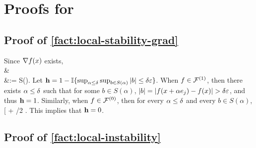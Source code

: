 \section{Proofs for \downtaskNAMEs{}}\label{sec:application-proofs}

\subsection{Proof of \cref{fact:local-stability-grad}}
%
%
%
%
%
%
%
%
%
%
%
%
%
%
%
%
%
%
%
%
%
%
%
%
%
%
%
%
%
Since $\nabla f(x)$ exists,
\*[
    \grad_j \model(\covval)
    = \lim_{\alpha \to 0} \frac{\model(\covval+\alpha e_j) - \model(\covval)}{\alpha}.
\]
Thus, for any $\outscale'>0$ there exists $\inscale>0$ such that for all $\alpha \leq \inscale$,
\*[
    \frac{\model(\covval+\alpha e_j) - \model(\covval)}{\alpha} 
    &\in
    \Big[
    \alpha \grad_j \model(\covval) - \alpha \outscale/4,
    \alpha \grad_j \model(\covval) + \alpha \outscale/4
    \Big] \\
    &\subseteq
     \\
    &:= S(\alpha).
\]
Let $\oraclehyptest = 1-\ind{\sup_{\alpha\leq\inscale} \sup_{b \in S(\alpha)} \abs{b} \leq \inscale \outscale}$. When $f \in \mathcal{F}^{(1)}$, then there exists $\alpha \leq \inscale$ such that for some $b \in S(\alpha)$, $\abs{b} = \abs{\model(\covval+\alpha e_j) - \model(\covval)} > \inscale\outscale$, and thus $\mathbf{h} = 1$.
Similarly, when $f\in\mathcal{F}^{(0)}$, then for every $\alpha \leq \inscale$ and every $b \in S(\alpha)$,
\*[
    \leq
     + \inscale\outscale/2
    \leq \inscale\outscale.
\]
This implies that $\mathbf{h} = 0$.

\manualendproof

\subsection{Proof of \cref{fact:local-instability}}


